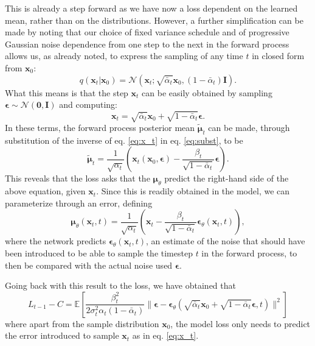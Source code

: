 \documentclass[a4paper, 12pt]{article}          %
\begin{document}
This is already a step forward as we have now a loss dependent on the learned mean, rather than on the distributions. However, a further simplification can be made by noting that our choice of fixed variance schedule and of progressive Gaussian noise dependence from one step to the next in the forward process allows us, as already noted, to express the sampling of any time $t$ in closed form from $\mathbf{x}_0$:
\begin{equation}
    q(\mathbf{x}_t | \mathbf{x}_0) = \mathcal{N}\left(\mathbf{x}_t ; \sqrt{\bar{\alpha}_t}\mathbf{x}_0 , (1-\bar{\alpha}_t)\mathbf{I} \right).
\end{equation}
What this means is that the step $\mathbf{x}_t$ can be easily obtained by sampling $\boldsymbol{\epsilon} \sim \mathcal{N}(\mathbf{0},\mathbf{I})$ and computing:
\begin{equation} \label{eq:x_t}
    \mathbf{x}_t = \sqrt{\bar{\alpha}_t} \mathbf{x}_0 + \sqrt{1 - \bar{\alpha}_t} \boldsymbol{\epsilon}.
\end{equation}
In these terms, the forward process posterior mean $\tilde{\boldsymbol{\mu}}_t$ can be made, through substitution of the inverse of eq. \ref{eq:x_t} in eq. \ref{eq:subst}, to be
\begin{equation}
    \tilde{\boldsymbol{\mu}}_t = \frac{1}{\sqrt{\alpha_t}}\left(\mathbf{x}_t (\mathbf{x}_0,\boldsymbol{\epsilon}) - \frac{\beta_t}{\sqrt{1-\bar{\alpha}_t}}\boldsymbol{\epsilon} \right).
\end{equation}
This reveals that the loss asks that the $\boldsymbol{\mu}_\theta$ predict the right-hand side of the above equation, given $\mathbf{x}_t$. Since this is readily obtained in the model, we can parameterize through an error, defining
\begin{equation}
    \boldsymbol{\mu}_\theta(\mathbf{x}_t, t) = \frac{1}{\sqrt{\alpha_t}}\left(\mathbf{x}_t - \frac{\beta_t}{\sqrt{1-\bar{\alpha}_t}}\boldsymbol{\epsilon}_\theta(\mathbf{x}_t,t)\right),
\end{equation}
where the network predicts $\boldsymbol{\epsilon}_\theta(\mathbf{x}_t, t)$, an estimate of the noise that should have been introduced to be able to sample the timestep $t$ in the forward process, to then be compared with the actual noise used $\boldsymbol{\epsilon}.$

Going back with this result to the loss, we have obtained that
\begin{equation}
    L_{t-1} - C = \mathbb{E} \left[ \frac{\beta_t^2}{2\sigma_t^2\alpha_t(1-\bar{\alpha}_t)} \| \boldsymbol{\epsilon} - \boldsymbol{\epsilon}_\theta \left(\sqrt{\bar{\alpha}_t}\mathbf{x}_0 + \sqrt{1-\bar{\alpha}_t} \boldsymbol{\epsilon},t\right) \|^2  \right]
\end{equation}
where apart from the sample distribution $\mathbf{x}_0$, the model loss only needs to predict the error introduced to sample $\mathbf{x}_t$ as in eq. \ref{eq:x_t}.
\end{document}
